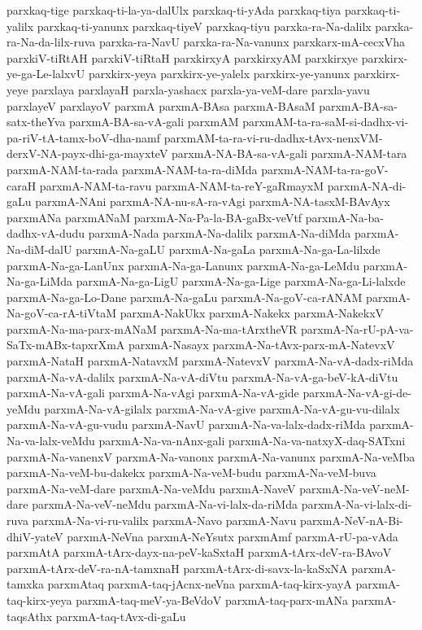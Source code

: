 {parxkaq-tige
parxkaq-ti-la-ya-dalUlx
parxkaq-ti-yAda
parxkaq-tiya
parxkaq-ti-yalilx
parxkaq-ti-yanunx
parxkaq-tiyeV
parxkaq-tiyu
parxka-ra-Na-dalilx
parxka-ra-Na-da-lilx-ruva
parxka-ra-NavU
parxka-ra-Na-vanunx
parxkarx-mA-cecxVha
parxkiV-tiRtAH
parxkiV-tiRtaH
parxkirxyA
parxkirxyAM
parxkirxye
parxkirx-ye-ga-Le-lalxvU
parxkirx-yeya
parxkirx-ye-yalelx
parxkirx-ye-yanunx
parxkirx-yeye
parxlaya
parxlayaH
parxla-yashacx
parxla-ya-veM-dare
parxla-yavu
parxlayeV
parxlayoV
parxmA
parxmA-BAsa
parxmA-BAsaM
parxmA-BA-sa-satx-theYva
parxmA-BA-sa-vA-gali
parxmAM
parxmAM-ta-ra-saM-si-dadhx-vi-pa-riV-tA-tamx-boV-dha-namf
parxmAM-ta-ra-vi-ru-dadhx-tAvx-nenxVM-derxV-NA-payx-dhi-ga-mayxteV
parxmA-NA-BA-sa-vA-gali
parxmA-NAM-tara
parxmA-NAM-ta-rada
parxmA-NAM-ta-ra-diMda
parxmA-NAM-ta-ra-goV-caraH
parxmA-NAM-ta-ravu
parxmA-NAM-ta-reY-gaRmayxM
parxmA-NA-di-gaLu
parxmA-NAni
parxmA-NA-nu-sA-ra-vAgi
parxmA-NA-tasxM-BAvAyx
parxmANa
parxmANaM
parxmA-Na-Pa-la-BA-gaBx-veVtf
parxmA-Na-ba-dadhx-vA-dudu
parxmA-Nada
parxmA-Na-dalilx
parxmA-Na-diMda
parxmA-Na-diM-dalU
parxmA-Na-gaLU
parxmA-Na-gaLa
parxmA-Na-ga-La-lilxde
parxmA-Na-ga-LanUnx
parxmA-Na-ga-Lanunx
parxmA-Na-ga-LeMdu
parxmA-Na-ga-LiMda
parxmA-Na-ga-LigU
parxmA-Na-ga-Lige
parxmA-Na-ga-Li-lalxde
parxmA-Na-ga-Lo-Dane
parxmA-Na-gaLu
parxmA-Na-goV-ca-rANAM
parxmA-Na-goV-ca-rA-tiVtaM
parxmA-NakUkx
parxmA-Nakekx
parxmA-NakekxV
parxmA-Na-ma-parx-mANaM
parxmA-Na-ma-tArxtheVR
parxmA-Na-rU-pA-va-SaTx-mABx-tapxrXmA
parxmA-Nasayx
parxmA-Na-tAvx-parx-mA-NatevxV
parxmA-NataH
parxmA-NatavxM
parxmA-NatevxV
parxmA-Na-vA-dadx-riMda
parxmA-Na-vA-dalilx
parxmA-Na-vA-diVtu
parxmA-Na-vA-ga-beV-kA-diVtu
parxmA-Na-vA-gali
parxmA-Na-vAgi
parxmA-Na-vA-gide
parxmA-Na-vA-gi-de-yeMdu
parxmA-Na-vA-gilalx
parxmA-Na-vA-give
parxmA-Na-vA-gu-vu-dilalx
parxmA-Na-vA-gu-vudu
parxmA-NavU
parxmA-Na-va-lalx-dadx-riMda
parxmA-Na-va-lalx-veMdu
parxmA-Na-va-nAnx-gali
parxmA-Na-va-natxyX-daq-SATxni
parxmA-Na-vanenxV
parxmA-Na-vanonx
parxmA-Na-vanunx
parxmA-Na-veMba
parxmA-Na-veM-bu-dakekx
parxmA-Na-veM-budu
parxmA-Na-veM-buva
parxmA-Na-veM-dare
parxmA-Na-veMdu
parxmA-NaveV
parxmA-Na-veV-neM-dare
parxmA-Na-veV-neMdu
parxmA-Na-vi-lalx-da-riMda
parxmA-Na-vi-lalx-di-ruva
parxmA-Na-vi-ru-valilx
parxmA-Navo
parxmA-Navu
parxmA-NeV-nA-Bi-dhiV-yateV
parxmA-NeVna
parxmA-NeYsutx
parxmAmf
parxmA-rU-pa-vAda
parxmAtA
parxmA-tArx-dayx-na-peV-kaSxtaH
parxmA-tArx-deV-ra-BAvoV
parxmA-tArx-deV-ra-nA-tamxnaH
parxmA-tArx-di-savx-la-kaSxNA
parxmA-tamxka
parxmAtaq
parxmA-taq-jAcnx-neVna
parxmA-taq-kirx-yayA
parxmA-taq-kirx-yeya
parxmA-taq-meV-ya-BeVdoV
parxmA-taq-parx-mANa
parxmA-taqsAthx
parxmA-taq-tAvx-di-gaLu
}
